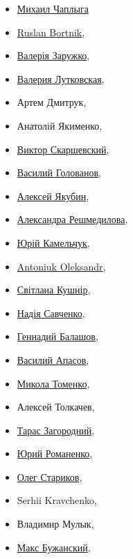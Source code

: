 \begin{multicols}{2}
\begin{itemize}
  \item \href{https://www.facebook.com/MikhailChaplyga}{Михаил Чаплыга}
  \item \href{https://www.facebook.com/ruslan.bortnik.3}{Ruslan Bortnik}, 
  \item \href{https://www.facebook.com/Zaruzhko.public}{Валерія Заружко},
  \item \href{https://www.facebook.com/vlutkovska}{Валерия Лутковская}, 
  \item Артем Дмитрук, 
  \item Анатолій Якименко, 
  \item \href{https://www.facebook.com/Viktor.Skarshevsky}{Виктор Скаршевский}, 
  \item \href{https://www.facebook.com/golovanov.vasiliy}{Василий Голованов},
  \item \href{https://www.facebook.com/profile.php?id=1352542874}{Алексей Якубин}, 
  \item \href{https://www.facebook.com/aleksandra.reshmedilova}{Александра Решмедилова}, 
  \item \href{https://www.facebook.com/yuriy.kamelchuk}{Юрій Камельчук}, 
  \item \href{https://www.facebook.com/oleks.antonyuk}{Antoniuk Oleksandr},
  \item \href{https://www.facebook.com/svitlana.kusnir}{Світлана Кушнір}, 
  \item \href{https://www.facebook.com/Savchenko.Nadiia}{Надія Савченко}, 
  \item \href{https://www.facebook.com/balashov.gennadiy}{Геннадий Балашов}, 
  \item \href{https://www.facebook.com/vasiliyapasoff}{Василий Апасов}, 
  \item \href{https://www.facebook.com/m.tomenko}{Микола Томенко}, 
  \item Алексей Толкачев, 
  \item \href{https://www.facebook.com/taras.zahorodniy}{Тарас Загородний}, 
  \item \href{https://www.facebook.com/yuriy.romanenko}{Юрий Романенко}, 
  \item \href{https://www.facebook.com/profile.php?id=100002892984274}{Олег Стариков},
  \item Serhii Kravchenko,
  \item Владимир Мулык, 
  \item \href{https://www.facebook.com/profile.php?id=100004634650264}{Макс Бужанский}, 

\end{itemize}
\end{multicols}
